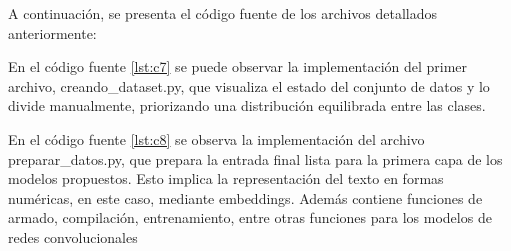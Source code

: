 A continuación, se presenta el código fuente de los  archivos detallados anteriormente:

En el código fuente \ref{lst:c7} se puede observar la implementación del primer archivo, creando\_dataset.py, que visualiza el estado del conjunto de datos y lo divide manualmente, priorizando una distribución equilibrada entre las clases.



En el código fuente \ref{lst:c8} se observa la implementación del archivo preparar\_datos.py, que prepara la entrada final lista para la primera capa de los modelos propuestos. Esto implica la representación del texto en formas numéricas, en este caso, mediante embeddings. Además contiene funciones de armado, compilación, entrenamiento, entre otras funciones para los modelos de redes convolucionales


